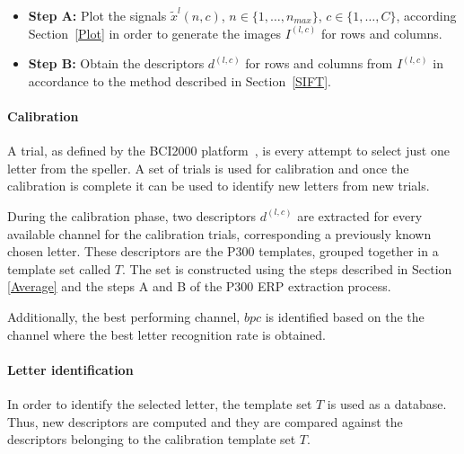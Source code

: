 \documentclass[utf8]{frontiersSCNS} %
\begin{document}
\begin{itemize}

\item \textbf{Step A:}\label{paso4} Plot the signals $\tilde{x}^l(n,c)$,  $n \in \{1, \dots, n_{max}\}$, $c \in \{1,\dots,C\}$,  according Section~\ref{Plot} in order to generate the images $I^{(l,c)}$ for rows and columns. 

\item \textbf{Step B:} Obtain the descriptors $ d^{(l,c)}$ for rows and columns from $I^{(l,c)}$  in accordance to the method described in Section~\ref{SIFT}. 

\end{itemize}

\paragraph{Calibration}

A trial, as defined by the BCI2000 platform~\citep{Schalk2004}, is every attempt to select just one letter from the speller.  A set of trials is used for calibration and once the calibration is complete it can be used to identify new letters from new trials.

During the calibration phase, two descriptors $ d^{(l,c)}$ are extracted for every available channel for the calibration trials, corresponding a previously known chosen letter.  These descriptors are the P300 templates, grouped together in a template set called $ T $.   The set is constructed using the steps described in Section \ref{Average} and the steps A and B of the P300 ERP extraction process.

Additionally, the best performing channel, $bpc$ is identified based on the the channel where the best letter recognition rate is obtained.

\paragraph{Letter identification}

In order to identify the selected letter, the template set $T$ is used as a database.  Thus, new descriptors are computed and they are compared against the descriptors belonging to the calibration template set $T$.
\end{document}

